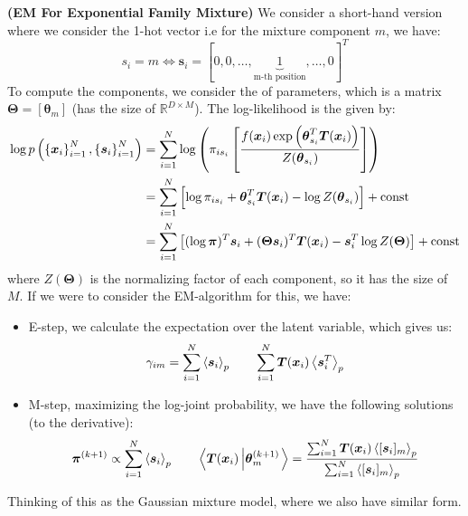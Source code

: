 \begin{remark}{\textbf{(EM For Exponential Family Mixture)}}
    We consider a short-hand version where we consider the 1-hot vector i.e for the mixture component $m$, we have:
    \begin{equation*}
        s_i = m \iff \boldsymbol s_i = [0,0,\dots, \underbrace{1}_\text{m-th position},\dots, 0]^T 
    \end{equation*}
    To compute the components, we consider the  of parameters, which is a matrix $\boldsymbol\Theta = [\boldsymbol \theta_m]$ (has the size of $\mathbb{R}^{D\times M}$). The log-likelihood is the given by:
    \begin{equation*}
    \begin{aligned}
        \log p\left( \left\{ \boldsymbol x_i \right\}^N_{i=1}, \left\{ \boldsymbol s_i \right\}^N_{i=1} \right) &= \sum^N_{i=1} \log \left( \pi_{i s_i} \left[ \frac{f(\boldsymbol x_i)\exp\left( \boldsymbol \theta_{s_i}^T\boldsymbol T(\boldsymbol x_i) \right)}{Z(\boldsymbol\theta_{s_i})} \right] \right) \\
        &= \sum^N_{i=1}\left[  \log \pi_{i s_i} + \boldsymbol \theta_{s_i}^T\boldsymbol T(\boldsymbol x_i) - \log Z(\boldsymbol\theta_{s_i}) \right] + \text{const} \\
        &= \sum^N_{i=1}\left[  (\log \boldsymbol \pi)^T\boldsymbol s_i + (\boldsymbol \Theta\boldsymbol s_i)^T\boldsymbol T(\boldsymbol x_i) - \boldsymbol s_i^T \log Z(\boldsymbol\Theta) \right] + \text{const}
    \end{aligned}
    \end{equation*}
    where $Z(\boldsymbol\Theta)$ is the normalizing factor of each component, so it has the size of $M$. If we were to consider the EM-algorithm for this, we have:
    \begin{itemize}
        \item E-step, we calculate the expectation over the latent variable, which gives us:
        \begin{equation*}
            \gamma_{im} = \sum^N_{i=1}\left\langle \boldsymbol s_i \right\rangle_p \qquad \sum^N_{i=1}\boldsymbol T(\boldsymbol x_i)\left\langle \boldsymbol s_i^T \right\rangle_p
        \end{equation*}
        \item M-step, maximizing the log-joint probability, we have the following solutions (to the derivative):
        \begin{equation*}
            \boldsymbol \pi^{(k+1)} \propto \sum^N_{i=1}\left\langle \boldsymbol s_i \right\rangle_p \qquad \left\langle \boldsymbol T(\boldsymbol x_i) \left| \boldsymbol \theta^{(k+1)}_m \right. \right\rangle = \frac{\sum^N_{i=1} \boldsymbol T(\boldsymbol x_i)\left\langle [\boldsymbol s_i]_m \right\rangle_p }{\sum^N_{i=1} \left\langle [\boldsymbol s_i]_m \right\rangle_p}
        \end{equation*}
    \end{itemize}
    Thinking of this as the Gaussian mixture model, where we also have similar form.
\end{remark}

